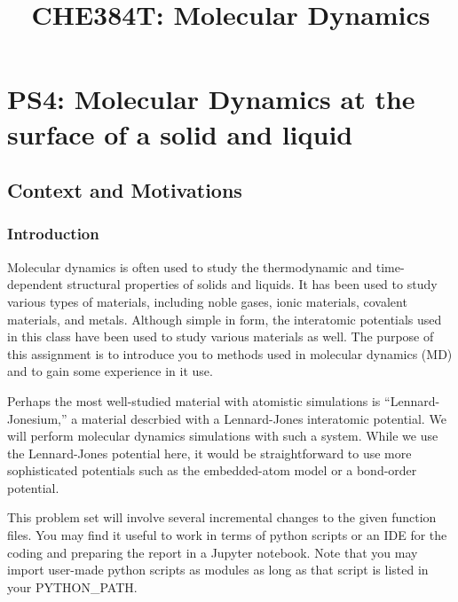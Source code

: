 \documentclass[11pt]{article}
\title{CHE384T: Molecular Dynamics}
\date{}
\begin{document}
    
    \maketitle
    
    

    
    \hypertarget{ps4-molecular-dynamics-at-the-surface-of-a-solid-and-liquid}{%
\section{PS4: Molecular Dynamics at the surface of a solid and
liquid}\label{ps4-molecular-dynamics-at-the-surface-of-a-solid-and-liquid}}

    \hypertarget{context-and-motivations}{%
\subsection{Context and Motivations}\label{context-and-motivations}}

\hypertarget{introduction}{%
\subsubsection{Introduction}\label{introduction}}

Molecular dynamics is often used to study the thermodynamic and
time-dependent structural properties of solids and liquids. It has been
used to study various types of materials, including noble gases, ionic
materials, covalent materials, and metals. Although simple in form, the
interatomic potentials used in this class have been used to study
various materials as well. The purpose of this assignment is to
introduce you to methods used in molecular dynamics (MD) and to gain
some experience in it use.

Perhaps the most well-studied material with atomistic simulations is
``Lennard-Jonesium,'' a material descrbied with a Lennard-Jones
interatomic potential. We will perform molecular dynamics simulations
with such a system. While we use the Lennard-Jones potential here, it
would be straightforward to use more sophisticated potentials such as
the embedded-atom model or a bond-order potential.

This problem set will involve several incremental changes to the given
function files. You may find it useful to work in terms of python
scripts or an IDE for the coding and preparing the report in a Jupyter
notebook. Note that you may import user-made python scripts as modules
as long as that script is listed in your PYTHON\_PATH.
\end{document}
